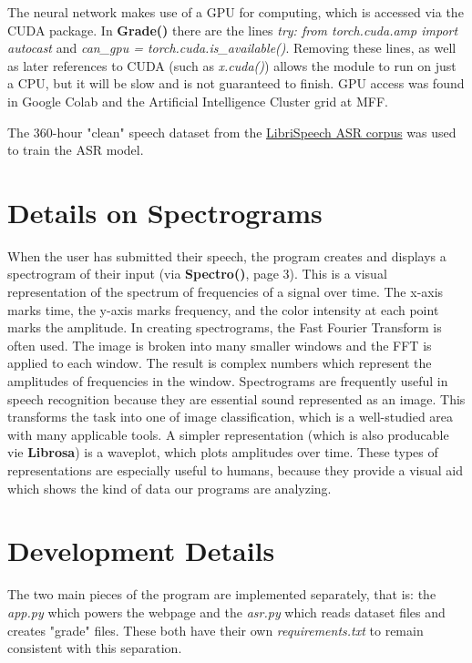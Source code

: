 \documentclass[12pt, letterpaper]{article}
\begin{document}
The neural network makes use of a GPU for computing, which is accessed via the CUDA package. In \textbf{Grade()} there are the lines \textit{try: from torch.cuda.amp import autocast} and \textit{can\_gpu = torch.cuda.is\_available()}. Removing these lines, as well as later references to CUDA (such as \textit{x.cuda()}) allows the module to run on just a CPU, but it will be slow and is not guaranteed to finish. GPU access was found in Google Colab and the Artificial Intelligence Cluster grid at MFF.

The 360-hour "clean" speech dataset from the \href{http://www.openslr.org/12/}{LibriSpeech ASR corpus} was used to train the ASR model.


\section*{Details on Spectrograms}
When the user has submitted their speech, the program creates and displays a spectrogram of their input (via \textbf{Spectro()}, page 3). This is a visual representation of the spectrum of frequencies of a signal over time. The x-axis marks time, the y-axis marks frequency, and the color intensity at each point marks the amplitude. In creating spectrograms, the Fast Fourier Transform is often used. The image is broken into many smaller windows and the FFT is applied to each window. The result is complex numbers which represent the amplitudes of frequencies in the window. Spectrograms are frequently useful in speech recognition because they are essential sound represented as an image. This transforms the task into one of image classification, which is a well-studied area with many applicable tools. A simpler representation (which is also producable vie \textbf{Librosa}) is a waveplot, which plots amplitudes over time. These types of representations are especially useful to humans, because they provide a visual aid which shows the kind of data our programs are analyzing.

\newpage%


\section*{Development Details}
The two main pieces of the program are implemented separately, that is: the \textit{app.py} which powers the webpage and the \textit{asr.py} which reads dataset files and creates "grade" files. These both have their own \textit{requirements.txt} to remain consistent with this separation. 
\end{document}
